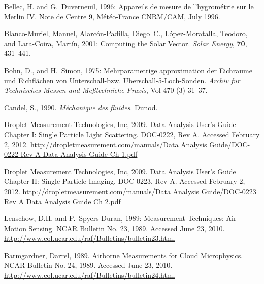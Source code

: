 \documentclass[a4paper,11pt]{report}
\begin{document}
\newpage{}
\begin{thebibliography}{5}

 Bellec, H. and G.~Duverneuil, 1996: Appareils de mesure de 
l'hygrom\'etrie sur le Merlin IV.  Note de Centre 9, M\'et\'eo-France 
CNRM/CAM, July 1996.

 Blanco-Muriel, Manuel, Alarc\'on-Padilla, Diego~C., L\'opez-Moratalla, Teodoro, 
and Lara-Coira, Mart\'in, 2001: Computing the Solar Vector. \emph{Solar Energy}, \textbf{70}, 431--441.

 Bohn, D., and H.~Simon, 1975: Mehrparametrige approximation der Eichraume und Eichfl\"achen von Unterschall-bzw. Uberschall-5-Loch-Sonden. \emph{Archiv fur Technisches Messen and Me{\ss}techniche Praxis}, Vol 470 (3) 31--37.

 Candel, S., 1990. \emph{M\'echanique des fluides}. Dunod.

 Droplet Measurement Technologies, Inc, 2009. Data Analysis User's Guide Chapter I:
Single Particle Light Scattering. DOC-0222, Rev A. Accessed February 2, 2012. 
\href{http://dropletmeasurement.com/manuals/Data\%20Analysis\%20Guide/DOC-0222\%20Rev\%20A\%20Data\%20Analysis\%20Guide\%20Ch\%201.pdf}{http://dropletmeasurement.com/manuals/Data Analysis Guide/DOC-0222 Rev A Data Analysis Guide Ch 1.pdf}

 Droplet Measurement Technologies, Inc, 2009. Data Analysis User's Guide Chapter II:
Single Particle Imaging. DOC-0223, Rev A. Accessed February 2, 2012. 
\href{http://dropletmeasurement.com/manuals/Data\%20Analysis\%20Guide/DOC-0223\%20Rev\%20A\%20Data\%20Analysis\%20Guide\%20Ch\%202.pdf}{http://dropletmeasurement.com/manuals/Data Analysis Guide/DOC-0223 Rev A Data Analysis Guide Ch 2.pdf}

 Lenschow, D.H. and P.~Spyers-Duran, 1989: Measurement Techniques: Air Motion Sensing.
NCAR Bulletin No. 23, 1989. Accessed June 23, 2010.
\href{http://www.eol.ucar.edu/raf/Bulletins/bulletin23.html}{http://www.eol.ucar.edu/raf/Bulletins/bulletin23.html}

 Barmgardner, Darrel, 1989. Airborne Measurements for Cloud Microphysics. 
NCAR Bulletin No. 24, 1989. Accessed June 23, 2010.  \href{http://www.eol.ucar.edu/raf/Bulletins/bulletin24.html}{http://www.eol.ucar.edu/raf/Bulletins/bulletin24.html}


\end{thebibliography}
\end{document}
